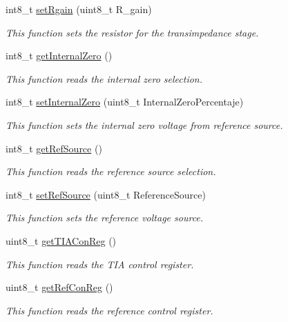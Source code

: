 \begin{DoxyCompactItemize}
int8\+\_\+t \hyperlink{class_l_m_p91000_a98ecad87ede37d32e5ad0f655345349f}{set\+Rgain} (uint8\+\_\+t R\+\_\+gain)
\begin{DoxyCompactList}\small\item\em This function sets the resistor for the transimpedance stage. \end{DoxyCompactList}\item 
int8\+\_\+t \hyperlink{class_l_m_p91000_aad55b04b5d5bcb41b2e67b35931d32ce}{get\+Internal\+Zero} ()
\begin{DoxyCompactList}\small\item\em This function reads the internal zero selection. \end{DoxyCompactList}\item 
int8\+\_\+t \hyperlink{class_l_m_p91000_ace1e29af8b2094ae00fc175af900dac0}{set\+Internal\+Zero} (uint8\+\_\+t Internal\+Zero\+Percentaje)
\begin{DoxyCompactList}\small\item\em This function sets the internal zero voltage from reference source. \end{DoxyCompactList}\item 
int8\+\_\+t \hyperlink{class_l_m_p91000_a1df22b02be3e25886c5310b30653c543}{get\+Ref\+Source} ()
\begin{DoxyCompactList}\small\item\em This function reads the reference source selection. \end{DoxyCompactList}\item 
int8\+\_\+t \hyperlink{class_l_m_p91000_a53dd59cce7311191d33a9fcec5f5be2f}{set\+Ref\+Source} (uint8\+\_\+t Reference\+Source)
\begin{DoxyCompactList}\small\item\em This function sets the reference voltage source. \end{DoxyCompactList}\item 
uint8\+\_\+t \hyperlink{class_l_m_p91000_a59992fd5a676028dec8188789bafa6d3}{get\+T\+I\+A\+Con\+Reg} ()
\begin{DoxyCompactList}\small\item\em This function reads the T\+IA control register. \end{DoxyCompactList}\item 
uint8\+\_\+t \hyperlink{class_l_m_p91000_a3ccee6196c5e05a5e8e193f36ce5fa53}{get\+Ref\+Con\+Reg} ()
\begin{DoxyCompactList}\small\item\em This function reads the reference control register. \end{DoxyCompactList}\item 

\end{DoxyCompactItemize}
